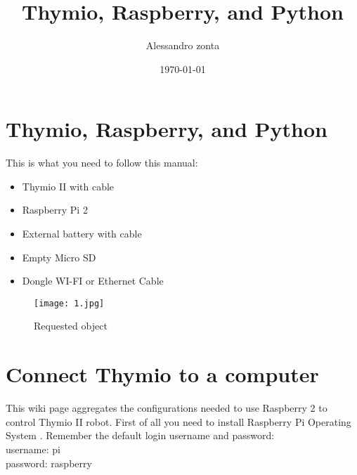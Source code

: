 \documentclass[12pt]{article}%
\begin{document}
\title{Thymio, Raspberry, and Python}
\author{Alessandro zonta}
\date{\today}
\maketitle

\section{Thymio, Raspberry, and Python}
	This is what you need to follow this manual:
	\begin{itemize}
			\item Thymio II with cable
			\item Raspberry Pi 2 
			\item External battery with cable
			\item Empty Micro SD
			\item Dongle WI-FI or Ethernet Cable
	\end{itemize}	
	\begin{figure}[h]
		\centering
		\texttt{[image: 1.jpg]}
		\caption{Requested object}
	\end{figure}		


\section{Connect Thymio to a computer}
	This wiki page aggregates the configurations needed to use Raspberry 2 to control Thymio II robot. 
	First of all you need to install Raspberry Pi Operating System \cite{rasp}.
	Remember the default login username and password:\\
	username: pi\\
	password: raspberry
\end{document}
